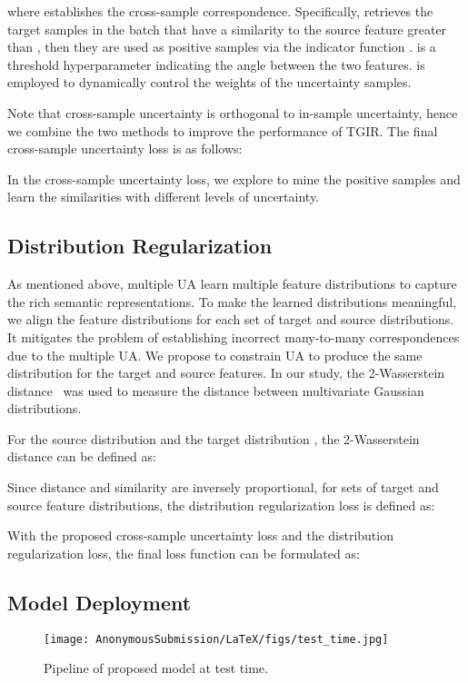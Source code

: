 \documentclass[letterpaper]{article} \usepackage{aaai24}  \usepackage{times}  \usepackage{helvet}  \usepackage{courier}  \usepackage[hyphens]{url}  \usepackage{graphicx} \urlstyle{rm} \def\UrlFont{\rm}  \usepackage{natbib}  \usepackage{caption} \frenchspacing  \setlength{\pdfpagewidth}{8.5in} \setlength{\pdfpageheight}{11in} \usepackage{amsmath,amsfonts}
\begin{document}
where  establishes the cross-sample correspondence. Specifically,  retrieves the target samples in the batch that have a similarity to the source feature greater than , then they are used as positive samples via the indicator function .  is a threshold hyperparameter indicating the angle between the two features.  is employed to dynamically control the weights of the uncertainty samples.

Note that cross-sample uncertainty is orthogonal to in-sample uncertainty, hence we combine the two methods to improve the performance of TGIR. The final cross-sample uncertainty loss is as follows:


In the cross-sample uncertainty loss, we explore to mine the positive samples and learn the similarities with different levels of uncertainty.  

\subsection{Distribution Regularization}
As mentioned above, multiple UA learn multiple feature distributions to capture the rich semantic representations. To make the learned distributions meaningful, we align the feature distributions for each set of target and source distributions. It mitigates the problem of establishing incorrect many-to-many correspondences due to the multiple UA. We propose to  constrain UA to produce the same distribution for the target and source features. In our study, the 2-Wasserstein distance~\cite{Gulrajani2017wgan,Kim21vilt} was used to measure the distance between multivariate Gaussian distributions. 

For the source distribution  and the target distribution , the 2-Wasserstein distance can be defined as:

Since distance and similarity are inversely proportional, for  sets of target and source feature distributions, the distribution regularization loss is defined as:



With the proposed cross-sample uncertainty loss and the distribution regularization loss,
the final loss function can be formulated as:




\subsection{Model Deployment}

\begin{figure}[htb]
    \centering
    \texttt{[image: AnonymousSubmission/LaTeX/figs/test\_time.jpg]}
    \caption{Pipeline of proposed model at test time.}
    \label{fig:test time}
\end{figure}
\end{document}

